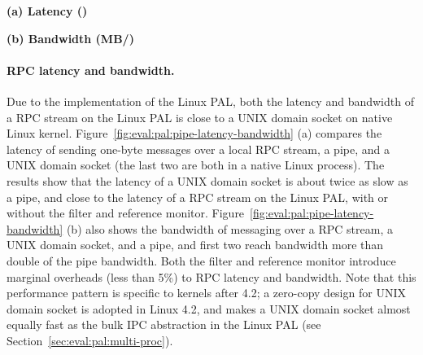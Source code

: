 \begin{figure*}[t!]
\centering
\footnotesize
{}
\parbox{0.30\textwidth}{\quad}
\parbox{0.34\textwidth}{\centering\bf (a) Latency ({\usec})}
\parbox{0.34\textwidth}{\centering\bf (b) Bandwidth (MB/\asec{})}
\caption{(a) Latency of sending a short message over RPC (lower is better), and (b) bandwidth of sending large data (higher is better).
The comparison is between (1)  and  over a pipe or an AF\_UNIX socket on Linux; (2)  and  on the Linux PAL, with and without a \seccomp{} filter ({\bf +SC}) and reference monitor ({\bf +RM}); (3) the same \hostapis{} on the SGX PAL, with and without data protection ({\bf +CHK}).}
\label{fig:eval:pal:pipe-latency-bandwidth}
\end{figure*}



\paragraph{RPC latency and bandwidth.}
Due to the implementation
of the Linux PAL,
both the latency and bandwidth
of a RPC stream on the Linux PAL is close to a UNIX domain socket
on native Linux kernel.
Figure~\ref{fig:eval:pal:pipe-latency-bandwidth} (a)
compares
the latency of sending one-byte messages
over a local RPC stream,
a pipe, and a UNIX domain socket (the last two are both in a native Linux process).
The results
show that the latency of a UNIX domain socket
is about twice as slow as a pipe,
and close to the latency of a RPC stream
on the Linux PAL,
with or without the \seccomp{} filter and reference monitor.
Figure~\ref{fig:eval:pal:pipe-latency-bandwidth} (b)
also shows the bandwidth
of messaging over a RPC stream, a UNIX domain socket,
and a pipe,
and first two reach bandwidth
more than double of the pipe bandwidth.
Both the \seccomp{} filter and reference monitor introduce marginal overheads (less than 5\%) to RPC latency and bandwidth.
Note that this performance pattern is specific
to kernels after 4.2; a zero-copy design for UNIX domain socket
is adopted in Linux 4.2,
and makes a UNIX domain socket
almost equally fast as the bulk IPC abstraction
in the Linux PAL
(see Section~\ref{sec:eval:pal:multi-proc}). 




